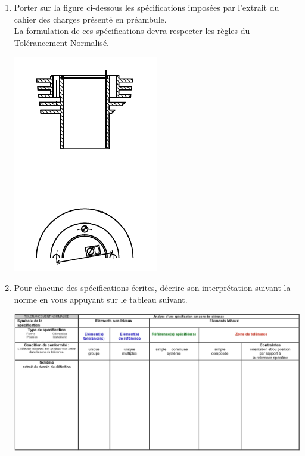 \begin{enumerate}
\item Porter sur la figure ci-dessous les spécifications imposées par l'extrait du cahier des charges
présenté en préambule.\\
La formulation de ces spécifications devra respecter les règles du Tolérancement Normalisé.

\begin{center}
\includegraphics[scale=0.7]{png/cylindre.png}
\end{center}

\item Pour chacune des spécifications écrites, décrire son interprétation suivant la norme en vous appuyant sur le tableau suivant.

\begin{center}
\includegraphics[scale=0.55]{png/doc_rep.png}
\end{center}
\end{enumerate}

\newpage
